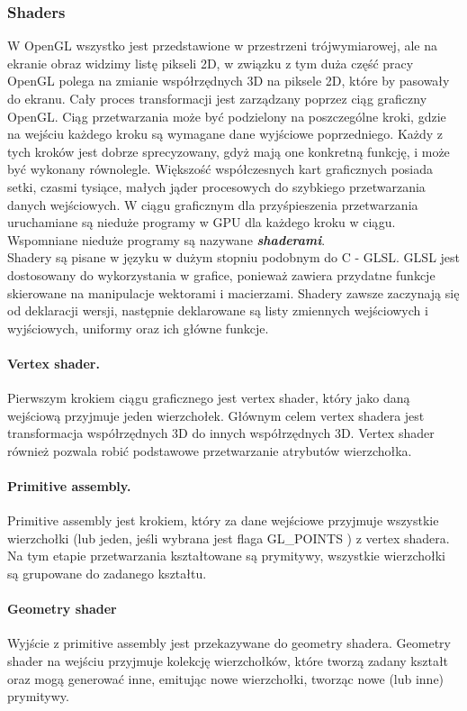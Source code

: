 \subsubsection{Shaders}
W OpenGL wszystko jest przedstawione w przestrzeni trójwymiarowej, ale na ekranie obraz widzimy listę pikseli 2D, w związku z tym duża część pracy OpenGL polega na zmianie współrzędnych 3D na piksele 2D, które by pasowały do ekranu. Cały proces transformacji jest zarządzany poprzez ciąg graficzny OpenGL. Ciąg przetwarzania może być podzielony na poszczególne kroki, gdzie na wejściu każdego kroku są wymagane dane wyjściowe poprzedniego. Każdy z tych kroków jest dobrze sprecyzowany, gdyż mają one konkretną funkcję, i może być wykonany równolegle. Większość współczesnych kart graficznych posiada setki, czasmi tysiące, małych jąder procesowych do szybkiego przetwarzania danych wejściowych. W ciągu graficznym dla przyśpieszenia przetwarzania uruchamiane są nieduże programy w GPU dla każdego kroku w ciągu. Wspomniane nieduże programy są nazywane \textit{\textbf{shaderami}}.\\
Shadery są pisane w języku w dużym stopniu podobnym do C - GLSL. GLSL jest dostosowany do wykorzystania w grafice, ponieważ zawiera przydatne funkcje skierowane na manipulacje wektorami i macierzami. Shadery zawsze zaczynają się od deklaracji wersji, następnie deklarowane są listy zmiennych wejściowych i wyjściowych, uniformy oraz ich główne funkcje. 
\paragraph*{Vertex shader.}
Pierwszym krokiem ciągu graficznego jest vertex shader, który jako daną wejściową przyjmuje jeden wierzchołek. Głównym celem vertex shadera jest transformacja współrzędnych 3D do innych współrzędnych 3D. Vertex shader również pozwala robić podstawowe przetwarzanie atrybutów wierzchołka.
\paragraph*{Primitive assembly.}
Primitive assembly jest krokiem, który za dane wejściowe przyjmuje wszystkie wierzchołki (lub jeden, jeśli wybrana jest flaga GL\_POINTS ) z vertex shadera. Na tym etapie przetwarzania kształtowane są prymitywy, wszystkie wierzchołki są grupowane do zadanego kształtu.
\paragraph*{Geometry shader}
Wyjście z primitive assembly jest przekazywane do geometry shadera. Geometry shader na wejściu przyjmuje kolekcję wierzchołków, które tworzą zadany kształt oraz mogą generować inne, emitując nowe wierzchołki, tworząc nowe (lub inne) prymitywy. 
